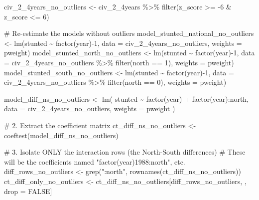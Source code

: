 \documentclass[
  letterpaper,
  DIV=11,
  numbers=noendperiod]{scrartcl}
\newenvironment{Shaded}{\begin{snugshade}}{\end{snugshade}}
\newcommand{\AttributeTok}[1]{\textcolor[rgb]{0.40,0.45,0.13}{#1}}
\newcommand{\CommentTok}[1]{\textcolor[rgb]{0.37,0.37,0.37}{#1}}
\newcommand{\ConstantTok}[1]{\textcolor[rgb]{0.56,0.35,0.01}{#1}}
\newcommand{\DecValTok}[1]{\textcolor[rgb]{0.68,0.00,0.00}{#1}}
\newcommand{\FunctionTok}[1]{\textcolor[rgb]{0.28,0.35,0.67}{#1}}
\newcommand{\NormalTok}[1]{\textcolor[rgb]{0.00,0.23,0.31}{#1}}
\newcommand{\OtherTok}[1]{\textcolor[rgb]{0.00,0.23,0.31}{#1}}
\newcommand{\SpecialCharTok}[1]{\textcolor[rgb]{0.37,0.37,0.37}{#1}}
\newcommand{\StringTok}[1]{\textcolor[rgb]{0.13,0.47,0.30}{#1}}
\begin{document}
\begin{Shaded}
\begin{Highlighting}[]
\NormalTok{civ\_2\_4years\_no\_outliers }\OtherTok{\textless{}{-}}\NormalTok{ civ\_2\_4years }\SpecialCharTok{\%\textgreater{}\%} \FunctionTok{filter}\NormalTok{(z\_score }\SpecialCharTok{\textgreater{}=} \SpecialCharTok{{-}}\DecValTok{6} \SpecialCharTok{\&}\NormalTok{ z\_score }\SpecialCharTok{\textless{}=} \DecValTok{6}\NormalTok{)}

\CommentTok{\# Re{-}estimate the models without outliers}
\NormalTok{model\_stunted\_national\_no\_outliers }\OtherTok{\textless{}{-}} \FunctionTok{lm}\NormalTok{(stunted }\SpecialCharTok{\textasciitilde{}} \FunctionTok{factor}\NormalTok{(year)}\SpecialCharTok{{-}}\DecValTok{1}\NormalTok{, }\AttributeTok{data =}\NormalTok{ civ\_2\_4years\_no\_outliers, }\AttributeTok{weights =}\NormalTok{ pweight)}
\NormalTok{model\_stunted\_north\_no\_outliers }\OtherTok{\textless{}{-}} \FunctionTok{lm}\NormalTok{(stunted }\SpecialCharTok{\textasciitilde{}} \FunctionTok{factor}\NormalTok{(year)}\SpecialCharTok{{-}}\DecValTok{1}\NormalTok{, }\AttributeTok{data =}\NormalTok{ civ\_2\_4years\_no\_outliers }\SpecialCharTok{\%\textgreater{}\%} \FunctionTok{filter}\NormalTok{(north }\SpecialCharTok{==} \DecValTok{1}\NormalTok{), }\AttributeTok{weights =}\NormalTok{ pweight)}
\NormalTok{model\_stunted\_south\_no\_outliers }\OtherTok{\textless{}{-}} \FunctionTok{lm}\NormalTok{(stunted }\SpecialCharTok{\textasciitilde{}} \FunctionTok{factor}\NormalTok{(year)}\SpecialCharTok{{-}}\DecValTok{1}\NormalTok{, }\AttributeTok{data =}\NormalTok{ civ\_2\_4years\_no\_outliers }\SpecialCharTok{\%\textgreater{}\%} \FunctionTok{filter}\NormalTok{(north }\SpecialCharTok{==} \DecValTok{0}\NormalTok{), }\AttributeTok{weights =}\NormalTok{ pweight)}

\NormalTok{model\_diff\_ns\_no\_outliers }\OtherTok{\textless{}{-}} \FunctionTok{lm}\NormalTok{(}
\NormalTok{  stunted }\SpecialCharTok{\textasciitilde{}} \FunctionTok{factor}\NormalTok{(year) }\SpecialCharTok{+} \FunctionTok{factor}\NormalTok{(year)}\SpecialCharTok{:}\NormalTok{north, }
  \AttributeTok{data =}\NormalTok{ civ\_2\_4years\_no\_outliers, }
  \AttributeTok{weights =}\NormalTok{ pweight}
\NormalTok{)}

\CommentTok{\# 2. Extract the coefficient matrix}
\NormalTok{ct\_diff\_ns\_no\_outliers }\OtherTok{\textless{}{-}} \FunctionTok{coeftest}\NormalTok{(model\_diff\_ns\_no\_outliers)}

\CommentTok{\# 3. Isolate ONLY the interaction rows (the North{-}South differences)}
\CommentTok{\# These will be the coefficients named "factor(year)1988:north", etc.}
\NormalTok{diff\_rows\_no\_outliers }\OtherTok{\textless{}{-}} \FunctionTok{grep}\NormalTok{(}\StringTok{":north"}\NormalTok{, }\FunctionTok{rownames}\NormalTok{(ct\_diff\_ns\_no\_outliers))}
\NormalTok{ct\_diff\_only\_no\_outliers }\OtherTok{\textless{}{-}}\NormalTok{ ct\_diff\_ns\_no\_outliers[diff\_rows\_no\_outliers, , drop }\OtherTok{=} \ConstantTok{FALSE}\NormalTok{]}


\end{Highlighting}
\end{Shaded}
\end{document}
